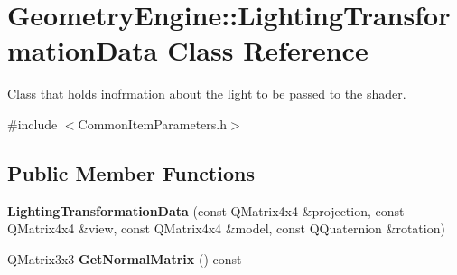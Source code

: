 \hypertarget{class_geometry_engine_1_1_lighting_transformation_data}{}\section{Geometry\+Engine\+::Lighting\+Transformation\+Data Class Reference}
\label{class_geometry_engine_1_1_lighting_transformation_data}


Class that holds inofrmation about the light to be passed to the shader.  




{\ttfamily \#include $<$Common\+Item\+Parameters.\+h$>$}

\subsection*{Public Member Functions}
\begin{DoxyCompactItemize}
\item 
\mbox{\label{class_geometry_engine_1_1_lighting_transformation_data_a5c7a44a5945d687cf63a45b3079b9e5d}} 
{\bfseries Lighting\+Transformation\+Data} (const Q\+Matrix4x4 \&projection, const Q\+Matrix4x4 \&view, const Q\+Matrix4x4 \&model, const Q\+Quaternion \&rotation)
\item 
\mbox{\label{class_geometry_engine_1_1_lighting_transformation_data_a64eae6bccd6826058a41e97c80b83fd3}} 
Q\+Matrix3x3 {\bfseries Get\+Normal\+Matrix} () const
\end{DoxyCompactItemize}
